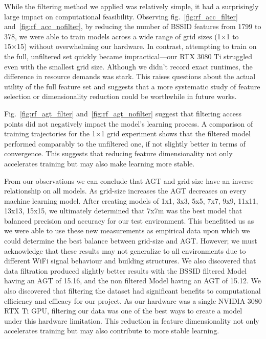 \documentclass[runningheads]{llncs}
\begin{document}
While the filtering method we applied was relatively simple, it had a surprisingly large impact on computational feasibility. Observing fig.~\ref{fig:rf_acc_filter} and~\ref{fig:rf_acc_nofilter}, by reducing the number of BSSID features from 1799 to 378, we were able to train models across a wide range of grid sizes (1×1 to 15×15) without overwhelming our hardware. In contrast, attempting to train on the full, unfiltered set quickly became impractical—our RTX 3080 Ti struggled even with the smallest grid size. Although we didn’t record exact runtimes, the difference in resource demands was stark. This raises questions about the actual utility of the full feature set and suggests that a more systematic study of feature selection or dimensionality reduction could be worthwhile in future works.

Fig.~\ref{fig:rf_agt_filter} and~\ref{fig:rf_agt_nofilter} suggest that filtering access points did not negatively impact the model's learning process. A comparison of training trajectories for the 1×1 grid experiment shows that the filtered model performed comparably to the unfiltered one, if not slightly better in terms of convergence. This suggests that reducing feature dimensionality not only accelerates training but may also make learning more stable.

From our observations we can conclude that AGT and grid size have an inverse relationship on all models. As grid-size increases the AGT decreases on every machine learning model. After creating models of 1x1, 3x3, 5x5, 7x7, 9x9, 11x11, 13x13, 15x15, we ultimately determined that 7x7m was the best model that balanced precision and accuracy for our test environment. This benefitted us as we were able to use these new measurements as empirical data upon which we could determine the best balance between grid-size and AGT. However; we must acknowledge that these results may not generalize to all environments due to different WiFi signal behaviour and building structures. We also discovered that data filtration produced slightly better results with the BSSID filtered Model having an AGT of 15.16, and the non filtered Model having an AGT of 15.12. We also discovered that filtering the dataset had significant benefits to computational efficiency and efficacy for our project. As our hardware was a single NVIDIA 3080 RTX Ti GPU, filtering our data was one of the best ways to create a model under this hardware limitation. This reduction in feature dimensionality not only accelerates training but may also contribute to more stable learning.
\end{document}
